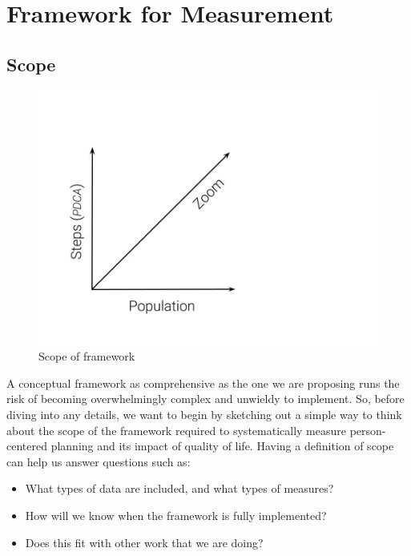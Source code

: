 \documentclass[
]{book}
\providecommand{\tightlist}{%
  \setlength{\itemsep}{0pt}\setlength{\parskip}{0pt}}
\begin{document}
\hypertarget{framework-for-measurement}{%
\section{Framework for Measurement}\label{framework-for-measurement}}

\hypertarget{scope}{%
\subsection{Scope}\label{scope}}

\begin{figure}
\includegraphics[width=24in]{_bookdown_files/img/QoL Framework Scope} \caption{Scope of framework}\label{fig:unnamed-chunk-14}
\end{figure}

A conceptual framework as comprehensive as the one we are proposing runs the risk of becoming overwhelmingly complex and unwieldy to implement. So, before diving into any details, we want to begin by sketching out a simple way to think about the scope of the framework required to systematically measure person-centered planning and its impact of quality of life. Having a definition of scope can help us answer questions such as:

\begin{itemize}
\tightlist
\item
  What types of data are included, and what types of measures?\\
\item
  How will we know when the framework is fully implemented?\\
\item
  Does this fit with other work that we are doing?
\end{itemize}
\end{document}

